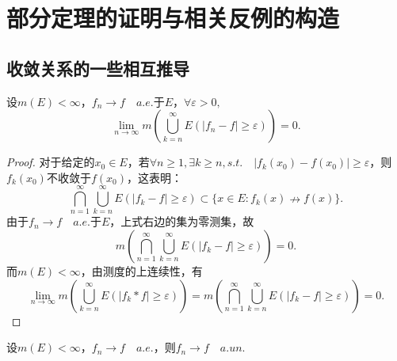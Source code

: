 \documentclass[bwprint, withoutpreface]{cumcmthesis}
\begin{document}
\section{部分定理的证明与相关反例的构造}
\subsection{收敛关系的一些相互推导}
\begin{theorem}
	设$m(E) < \infty$，$f_n \to f \quad a.e.\mbox{于}E$，$\forall \varepsilon > 0,$
	\begin{equation*}
		\lim_{n \to \infty} m(\bigcup_{k = n}^{\infty}{E(|f_n - f| \geqslant \varepsilon)}) = 0.
	\end{equation*} 
\end{theorem}

\begin{proof}
	对于给定的$x_0 \in E$，若$\forall n \geqslant 1, \exists k \geqslant n, s.t. \quad |f_k(x_0) - f(x_0)| \geqslant \varepsilon$，则$f_k(x_0)$不收敛于$f(x_0)$，这表明：
	\begin{equation*}
		\bigcap_{n = 1}^{\infty}{\bigcup_{k = n}^{\infty}{E(|f_k - f| \geqslant \varepsilon)}} \subset \{x \in E: f_k(x) \nrightarrow f(x)\}.
	\end{equation*}
	由于$f_n \to f \quad a.e. \mbox{于}E$，上式右边的集为零测集，故
	\begin{equation*}
		m(\bigcap_{n = 1}^{\infty}{\bigcup_{k = n}^{\infty}{E(|f_k - f| \geqslant \varepsilon)}}) = 0.
	\end{equation*}
	而$m(E) < \infty$，由测度的上连续性，有
	\begin{equation*}
		\lim_{n \to \infty} m(\bigcup_{k = n}^{\infty}{E(|f_k * f| \geqslant \varepsilon)}) = m(\bigcap_{n = 1}^{\infty}{\bigcup_{k = n}^{\infty}{E(|f_k - f| \geqslant \varepsilon)}}) = 0.
	\end{equation*}
\end{proof}

\begin{theorem}[Egoroff定理]
	设$m(E) < \infty$，$f_n \to f \quad a.e.$，则$f_n \to f \quad a.un.$
\end{theorem}
\end{document}
